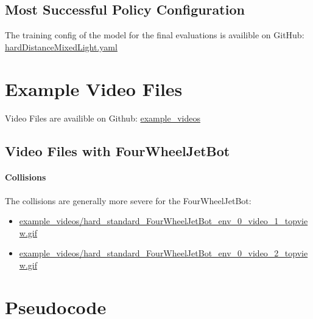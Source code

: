 \subsection{Most Successful Policy Configuration}
\label{cha:most_successful_config}

The training config of the model for the final evaluations is availible on GitHub:
\href{https://github.com/geschnee/carsim-rl-cnn/tree/main/python/cfg/hardDistanceMixedLight.yaml}{hardDistanceMixedLight.yaml}

\section{Example Video Files}
\label{cha:example_videos}

Video Files are availible on Github:
\href{https://github.com/geschnee/carsim-rl-cnn/tree/main/python/results/example_videos}{example\_videos}

\subsection{Video Files with FourWheelJetBot}

\paragraph{Collisions}
\label{sec:fourwheel_collisions}

The collisions are generally more severe for the FourWheelJetBot:

\begin{itemize}
    \item \href{https://huggingface.co/geschnee/carsim-rl-cnn/blob/main/example_videos_FourWheelJetbot/hard_standard_FourWheelJetBot_env_0_video_1_topview.gif}{example\_videos/hard\_standard\_FourWheelJetBot\_env\_0\_video\_1\_topview.gif}
    \item \href{https://huggingface.co/geschnee/carsim-rl-cnn/blob/main/example_videos_FourWheelJetbot/hard_standard_FourWheelJetBot_env_0_video_2_topview.gif}{example\_videos/hard\_standard\_FourWheelJetBot\_env\_0\_video\_2\_topview.gif}
\end{itemize}





\section{Pseudocode}

